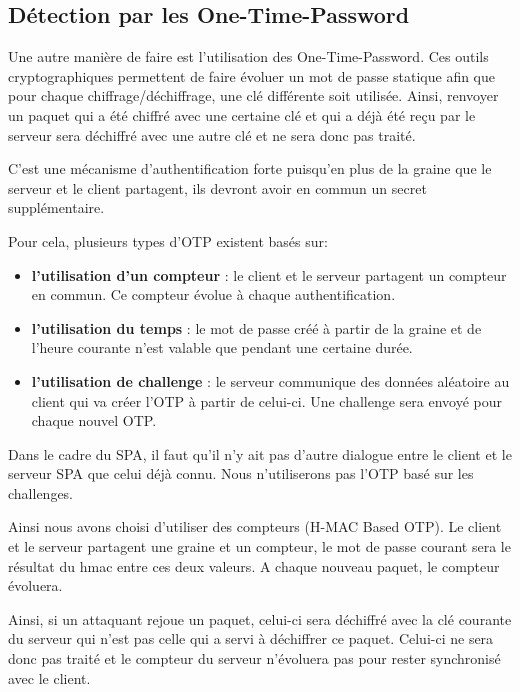 \subsection{Détection par les \textbf{O}ne-\textbf{T}ime-\textbf{P}assword}

Une autre manière de faire est l'utilisation des One-Time-Password. Ces outils cryptographiques permettent de faire évoluer un mot de passe statique afin que pour chaque chiffrage/déchiffrage, une clé différente soit utilisée. Ainsi, renvoyer un paquet qui a été chiffré avec une certaine clé et qui a déjà été reçu par le serveur sera déchiffré avec une autre clé et ne sera donc pas traité.

C'est une mécanisme d'authentification forte puisqu'en plus de la graine que le serveur et le client partagent, ils devront avoir en commun un secret supplémentaire.

Pour cela, plusieurs types d'OTP existent basés sur:

\begin{itemize}

\item \textbf{l'utilisation d'un compteur} : le client et le serveur partagent un compteur en commun. Ce compteur évolue à chaque authentification.

\item \textbf{l'utilisation du temps} : le mot de passe créé à partir de la graine et de l'heure courante n'est valable que pendant une certaine durée.

\item \textbf{l'utilisation de challenge} : le serveur communique des données aléatoire au client qui va créer l'OTP à partir de celui-ci. Une challenge sera envoyé pour chaque nouvel OTP.

\end{itemize}

\vspace{0.5cm}

Dans le cadre du SPA, il faut qu'il n'y ait pas d'autre dialogue entre le client et le serveur SPA que celui déjà connu. Nous n'utiliserons pas l'OTP basé sur les challenges.

Ainsi nous avons choisi d'utiliser des compteurs (H-MAC Based OTP). Le client et le serveur partagent une graine et un compteur, le mot de passe courant sera le résultat du hmac entre ces deux valeurs. A chaque nouveau paquet, le compteur évoluera.

Ainsi, si un attaquant rejoue un paquet, celui-ci sera déchiffré avec la clé courante du serveur qui n'est pas celle qui a servi à déchiffrer ce paquet. Celui-ci ne sera donc pas traité et le compteur du serveur n'évoluera pas pour rester synchronisé avec le client.

